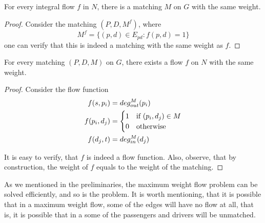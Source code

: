 \begin{lemma}
For every integral flow $f$ in $N$, there is a matching $M$ on $G$ with the same weight. 
\end{lemma}

\begin{proof}
Consider the matching $(P, D, M^f)$, where 
$$ M^f = \{(p, d) \in E_{pd} : f(p, d) = 1\} $$
one can verify that this is indeed a matching with the same weight as $f$.
\end{proof}

\begin{lemma}
For every matching $(P, D, M)$ on $G$, there exists a flow $f$ on $N$ with the same weight. 
\end{lemma}

\begin{proof}
Consider the flow function
\begin{align*}
f(s, p_i)		& = deg^M_{out}(p_i)		 				\\
f(p_i, d_j)		& = 
				\begin{cases}
				1 & \text{if } (p_i, d_j) \in M		\\
				0 & \text{otherwise}
				\end{cases}						\\
f(d_j, t) 	& = deg^M_{in}(d_j) 
\end{align*}

It is easy to verify, that $f$ is indeed a flow function.
Also, observe, that by construction,
the weight of $f$ equals to the weight of the matching.
\end{proof}

As we mentioned in the preliminaries, 
the maximum weight flow problem can be solved efficiently, 
and so is the \FIXEDCARPOOL{} problem.
It is worth mentioning, that it is possible that in a maximum weight flow, 
some of the edges will have no flow at all, 
that is, it is possible that in a \FIXEDCARPOOL{}
some of the passengers and drivers will be unmatched.  